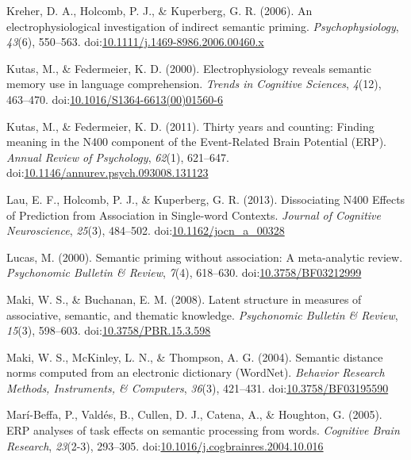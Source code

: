 \documentclass[english,man]{apa6}
\theoremstyle{definition}
\theoremstyle{definition}
\theoremstyle{remark}
\begin{document}
\hypertarget{ref-Kreher2006}{}
Kreher, D. A., Holcomb, P. J., \& Kuperberg, G. R. (2006). An
electrophysiological investigation of indirect semantic priming.
\emph{Psychophysiology}, \emph{43}(6), 550--563.
doi:\href{https://doi.org/10.1111/j.1469-8986.2006.00460.x}{10.1111/j.1469-8986.2006.00460.x}

\hypertarget{ref-Kutas2000}{}
Kutas, M., \& Federmeier, K. D. (2000). Electrophysiology reveals
semantic memory use in language comprehension. \emph{Trends in Cognitive
Sciences}, \emph{4}(12), 463--470.
doi:\href{https://doi.org/10.1016/S1364-6613(00)01560-6}{10.1016/S1364-6613(00)01560-6}

\hypertarget{ref-Kutas2011}{}
Kutas, M., \& Federmeier, K. D. (2011). Thirty years and counting:
Finding meaning in the N400 component of the Event-Related Brain
Potential (ERP). \emph{Annual Review of Psychology}, \emph{62}(1),
621--647.
doi:\href{https://doi.org/10.1146/annurev.psych.093008.131123}{10.1146/annurev.psych.093008.131123}

\hypertarget{ref-Lau2013}{}
Lau, E. F., Holcomb, P. J., \& Kuperberg, G. R. (2013). Dissociating
N400 Effects of Prediction from Association in Single-word Contexts.
\emph{Journal of Cognitive Neuroscience}, \emph{25}(3), 484--502.
doi:\href{https://doi.org/10.1162/jocn_a_00328}{10.1162/jocn\_a\_00328}

\hypertarget{ref-Lucas2000}{}
Lucas, M. (2000). Semantic priming without association: A meta-analytic
review. \emph{Psychonomic Bulletin \& Review}, \emph{7}(4), 618--630.
doi:\href{https://doi.org/10.3758/BF03212999}{10.3758/BF03212999}

\hypertarget{ref-Maki2008}{}
Maki, W. S., \& Buchanan, E. M. (2008). Latent structure in measures of
associative, semantic, and thematic knowledge. \emph{Psychonomic
Bulletin \& Review}, \emph{15}(3), 598--603.
doi:\href{https://doi.org/10.3758/PBR.15.3.598}{10.3758/PBR.15.3.598}

\hypertarget{ref-Maki2004}{}
Maki, W. S., McKinley, L. N., \& Thompson, A. G. (2004). Semantic
distance norms computed from an electronic dictionary (WordNet).
\emph{Behavior Research Methods, Instruments, \& Computers},
\emph{36}(3), 421--431.
doi:\href{https://doi.org/10.3758/BF03195590}{10.3758/BF03195590}

\hypertarget{ref-Mari-Beffa2005}{}
Marí-Beffa, P., Valdés, B., Cullen, D. J., Catena, A., \& Houghton, G.
(2005). ERP analyses of task effects on semantic processing from words.
\emph{Cognitive Brain Research}, \emph{23}(2-3), 293--305.
doi:\href{https://doi.org/10.1016/j.cogbrainres.2004.10.016}{10.1016/j.cogbrainres.2004.10.016}
\end{document}

